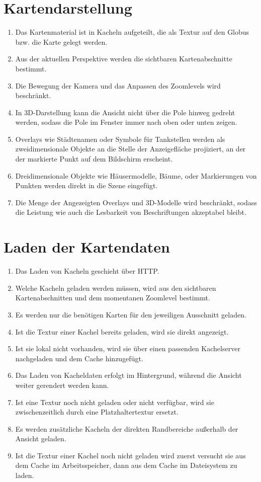 \documentclass[10pt]{scrreprt}
\begin{document}
\section{Kartendarstellung}
\begin{enumerate}[leftmargin=2cm,resume]
\item Das Kartenmaterial ist in Kacheln aufgeteilt, die als Textur auf den Globus bzw. die Karte gelegt werden.
\item Aus der aktuellen Perspektive werden die sichtbaren Kartenabschnitte bestimmt.
\item Die Bewegung der Kamera und das Anpassen des Zoomlevels wird beschränkt.
\item In 3D-Darstellung kann die Ansicht nicht über die Pole hinweg gedreht werden, sodass die Pole im Fenster immer nach oben oder unten zeigen.
\item Overlays wie Städtenamen oder Symbole für Tankstellen werden als zweidimensionale Objekte an die Stelle der Anzeigefläche projiziert, an der der markierte Punkt auf dem Bildschirm erscheint.
\item \W Dreidimensionale Objekte wie Häusermodelle, Bäume, oder  Markierungen von Punkten werden direkt in die Szene eingefügt.
\item \W Die Menge der Angezeigten Overlays und 3D-Modelle wird beschränkt, sodass die Leistung wie auch die Lesbarkeit von Beschriftungen akzeptabel bleibt.
\end{enumerate}

\section{Laden der Kartendaten}
\begin{enumerate}[resume,leftmargin=2cm]
\item Das Laden von Kacheln geschieht über HTTP.
\item Welche Kacheln geladen werden müssen, wird  aus den sichtbaren Kartenabschnitten und dem momentanen Zoomlevel bestimmt.
\item Es werden nur die benötigen Karten für den jeweiligen Ausschnitt geladen.
\item Ist die Textur einer Kachel bereits geladen, wird sie direkt angezeigt.
\item Ist sie lokal nicht vorhanden, wird sie über einen passenden Kachelserver nachgeladen und dem Cache hinzugefügt.
\item Das Laden von Kacheldaten erfolgt im Hintergrund, während die Ansicht weiter gerendert werden kann.
\item \W Ist eine Textur noch nicht geladen oder nicht verfügbar, wird sie zwischenzeitlich durch eine Platzhaltertextur ersetzt.
\item \W Es werden zusätzliche Kacheln der direkten Randbereiche außerhalb der Ansicht geladen.
\item \W Ist die Textur einer Kachel noch nicht geladen wird zuerst versucht sie aus dem Cache im Arbeitsspeicher, dann aus dem Cache im Dateisystem zu laden.
\end{enumerate}
\end{document}
